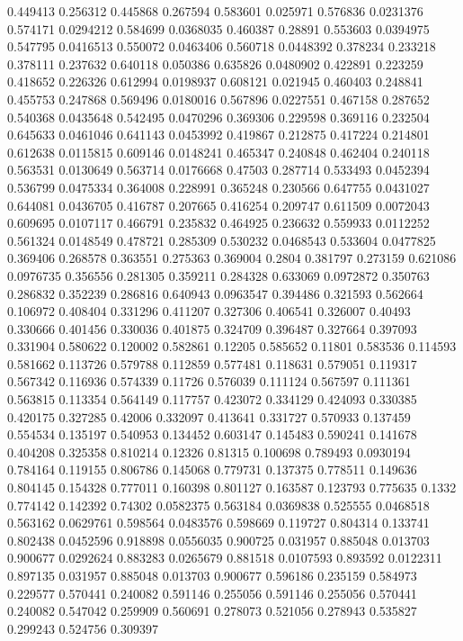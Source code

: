 0.449413 0.256312
0.445868 0.267594
0.583601 0.025971
0.576836 0.0231376
0.574171 0.0294212
0.584699 0.0368035
0.460387 0.28891
0.553603 0.0394975
0.547795 0.0416513
0.550072 0.0463406
0.560718 0.0448392
0.378234 0.233218
0.378111 0.237632
0.640118 0.050386
0.635826 0.0480902
0.422891 0.223259
0.418652 0.226326
0.612994 0.0198937
0.608121 0.021945
0.460403 0.248841
0.455753 0.247868
0.569496 0.0180016
0.567896 0.0227551
0.467158 0.287652
0.540368 0.0435648
0.542495 0.0470296
0.369306 0.229598
0.369116 0.232504
0.645633 0.0461046
0.641143 0.0453992
0.419867 0.212875
0.417224 0.214801
0.612638 0.0115815
0.609146 0.0148241
0.465347 0.240848
0.462404 0.240118
0.563531 0.0130649
0.563714 0.0176668
0.47503 0.287714
0.533493 0.0452394
0.536799 0.0475334
0.364008 0.228991
0.365248 0.230566
0.647755 0.0431027
0.644081 0.0436705
0.416787 0.207665
0.416254 0.209747
0.611509 0.0072043
0.609695 0.0107117
0.466791 0.235832
0.464925 0.236632
0.559933 0.0112252
0.561324 0.0148549
0.478721 0.285309
0.530232 0.0468543
0.533604 0.0477825
0.369406 0.268578
0.363551 0.275363
0.369004 0.2804
0.381797 0.273159
0.621086 0.0976735
0.356556 0.281305
0.359211 0.284328
0.633069 0.0972872
0.350763 0.286832
0.352239 0.286816
0.640943 0.0963547
0.394486 0.321593
0.562664 0.106972
0.408404 0.331296
0.411207 0.327306
0.406541 0.326007
0.40493 0.330666
0.401456 0.330036
0.401875 0.324709
0.396487 0.327664
0.397093 0.331904
0.580622 0.120002
0.582861 0.12205
0.585652 0.11801
0.583536 0.114593
0.581662 0.113726
0.579788 0.112859
0.577481 0.118631
0.579051 0.119317
0.567342 0.116936
0.574339 0.11726
0.576039 0.111124
0.567597 0.111361
0.563815 0.113354
0.564149 0.117757
0.423072 0.334129
0.424093 0.330385
0.420175 0.327285
0.42006 0.332097
0.413641 0.331727
0.570933 0.137459
0.554534 0.135197
0.540953 0.134452
0.603147 0.145483
0.590241 0.141678
0.404208 0.325358
0.810214 0.12326
0.81315 0.100698
0.789493 0.0930194
0.784164 0.119155
0.806786 0.145068
0.779731 0.137375
0.778511 0.149636
0.804145 0.154328
0.777011 0.160398
0.801127 0.163587
0.123793 0.775635
0.1332 0.774142
0.142392 0.74302
0.0582375 0.563184
0.0369838 0.525555
0.0468518 0.563162
0.0629761 0.598564
0.0483576 0.598669
0.119727 0.804314
0.133741 0.802438
0.0452596 0.918898
0.0556035 0.900725
0.031957 0.885048
0.013703 0.900677
0.0292624 0.883283
0.0265679 0.881518
0.0107593 0.893592
0.0122311 0.897135
0.031957 0.885048
0.013703 0.900677
0.596186 0.235159
0.584973 0.229577
0.570441 0.240082
0.591146 0.255056
0.591146 0.255056
0.570441 0.240082
0.547042 0.259909
0.560691 0.278073
0.521056 0.278943
0.535827 0.299243
0.524756 0.309397
